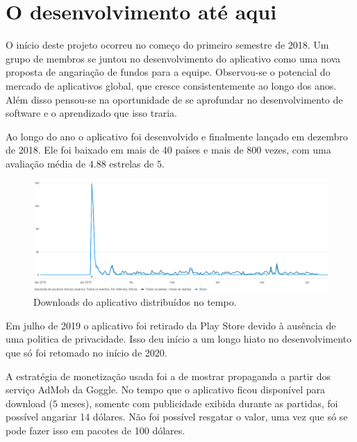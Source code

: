 \tableofcontents          %
\thispagestyle{empty}     %
\listoffigures            %
\thispagestyle{empty}     %
\mainmatter

\chapter{O desenvolvimento até aqui}

    O início deste projeto ocorreu no começo do primeiro semestre de 2018. Um grupo de membros se juntou no desenvolvimento do aplicativo como uma nova proposta de angariação de fundos para a equipe. 
    Observou-se o potencial do mercado de aplicativos global, que cresce consistentemente ao longo dos anos.
    Além disso pensou-se na oportunidade de se aprofundar no desenvolvimento de software e o aprendizado que isso traria.

    Ao longo do ano o aplicativo foi desenvolvido e finalmente lançado em dezembro de 2018. Ele foi baixado em mais de 40 países e mais de 800 vezes, com uma avaliação média de $4.88$ estrelas de $5$. 

    \begin{figure}[h!]
        \centering
        \includegraphics[trim = {0cm 0cm 0cm 0cm}, clip , angle=0, scale=0.55]{midia/users_global.png}
        \caption{Downloads do aplicativo distribuídos no tempo.}
        \label{pika1}
    \end{figure}

    Em julho de 2019 o aplicativo foi retirado da Play Store devido à ausência de uma politica de privacidade. Isso deu início a um longo hiato no desenvolvimento que só foi retomado no início de 2020. 
    
    A estratégia de monetização usada foi a de mostrar propaganda a partir dos serviço AdMob da Goggle.
    No tempo que o aplicativo ficou disponível para download ($5$ meses), somente com publicidade exibida durante as partidas, foi possível angariar 14 dólares. Não foi possível resgatar o valor, uma vez que só se pode fazer isso em pacotes de 100 dólares.

